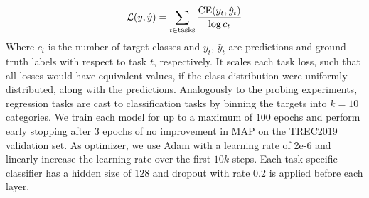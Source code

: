 \begin{equation}
    \mathcal{L}(y, \hat{y}) = \sum_{t \in \text{tasks}} \frac{\textnormal{CE}(y_t, \hat{y}_t)}{\log c_t}
\end{equation}
Where $c_t$ is the number of target classes and $y_t$, $\hat{y}_t$ are predictions and ground-truth labels with respect to task $t$, respectively. It scales each task loss, such that all losses would have equivalent values, if the class distribution were uniformly distributed, along with the predictions. Analogously to the probing experiments, regression tasks are cast to classification tasks by binning the targets into $k=10$ categories.
We train each model for up to a maximum of $100$ epochs and perform early stopping after $3$ epochs of no improvement in MAP on the TREC2019 validation set. As optimizer, we use Adam\cite{kingma2014adam} with a learning rate of 2e-6 and linearly increase the learning rate over the first $10k$ steps. Each task specific classifier has a hidden size of $128$ and dropout with rate $0.2$ is applied before each layer.

